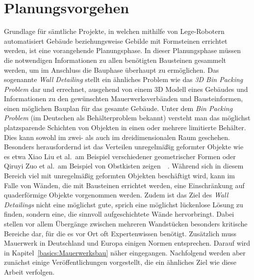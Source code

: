 \section{Planungsvorgehen}\label{related:planungsvorgehen}
Grundlage für sämtliche Projekte, in welchen mithilfe von Lege-Robotern automatisiert Gebäude beziehungsweise Gebilde mit Formsteinen errichtet werden, ist eine vorangehende Planungsphase.
In dieser Planungsphase müssen die notwendigen Informationen zu allen benötigten Bausteinen gesammelt werden, um im Anschluss die Bauphase überhaupt zu ermöglichen.
Das sogenannte \textit{Wall Detailing} stellt ein ähnliches Problem wie das \textit{3D Bin Packing Problem} dar und errechnet, ausgehend von einem 3D Modell eines Gebäudes und Informationen zu den gewünschten Mauerwerksverbänden und Bausteinformen, einen möglichen Bauplan für das gesamte Gebäude.
Unter dem \textit{Bin Packing Problem} (im Deutschen als Behälterproblem bekannt) versteht man das möglichst platzsparende Schichten von Objekten in einen oder mehrere limitierte Behälter.
Dies kann sowohl im zwei- als auch im dreidimensionalen Raum geschehen.
Besonders herausfordernd ist das Verteilen unregelmäßig geformter Objekte wie es etwa Xiao Liu et al.\ am Beispiel verschiedener geometrischer Formen oder Qiruyi Zuo et al.\ am Beispiel von Obstkisten zeigen~\cite{Liu2015}~\cite{Zuo2022}.
Während sich in diesem Bereich viel mit unregelmäßig geformten Objekten beschäftigt wird, kann im Falle von Wänden, die mit Bausteinen errichtet werden, eine Einschränkung auf quaderförmige Objekte vorgenommen werden.
Zudem ist das Ziel des \textit{Wall Detailings} nicht eine möglichst gute, sprich eine möglichst lückenlose Lösung zu finden, sondern eine, die sinnvoll aufgeschichtete Wände hervorbringt.
Dabei stellen vor allem Übergänge zwischen mehreren Wandstücken besonders kritische Bereiche dar, für die es vor Ort oft Expertenwissen benötigt.
Zusätzlich muss Mauerwerk in Deutschland und Europa einigen Normen entsprechen. 
Darauf wird in Kapitel~\ref{basics:Mauerwerksbau} näher eingegangen.
Nachfolgend werden aber zunächst einige Veröffentlichungen vorgestellt, die ein ähnliches Ziel wie diese Arbeit verfolgen.

